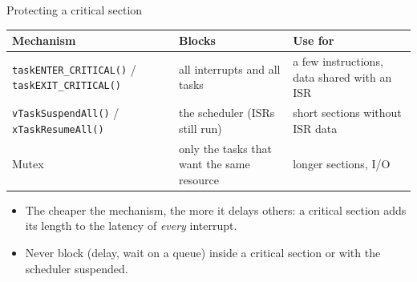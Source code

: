 \begin{frame}{Protecting a critical section}
  \begin{center}\small
  \begin{tabular}{@{}p{}p{}p{}@{}}
    \toprule
    Mechanism & Blocks & Use for \\
    \midrule
    \texttt{taskENTER\_CRITICAL()} / \texttt{taskEXIT\_CRITICAL()} & all interrupts and all tasks & a few instructions, data shared with an ISR \\
    \texttt{vTaskSuspendAll()} / \texttt{xTaskResumeAll()} & the scheduler (ISRs still run) & short sections without ISR data \\
    Mutex & only the tasks that want the same resource & longer sections, I/O \\
    \bottomrule
  \end{tabular}
  \end{center}
  \begin{itemize}
    \item The cheaper the mechanism, the more it delays others: a critical section adds its length to the latency of \emph{every} interrupt.
    \item Never block (delay, wait on a queue) inside a critical section or with the scheduler suspended.
  \end{itemize}
\end{frame}


